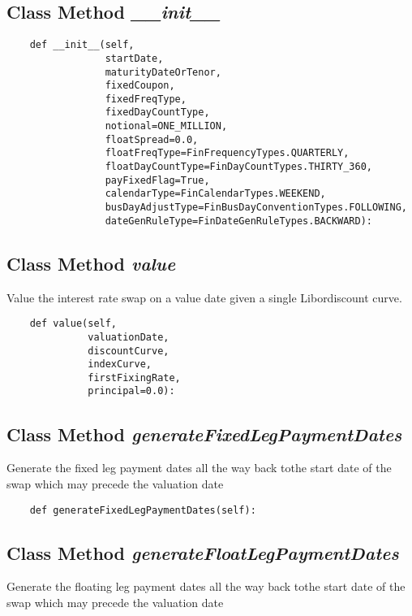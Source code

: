 \documentclass[twoside,11pt]{book}
\begin{document}
\subsection{Class Method {\it \_\_init\_\_}}


\begin{lstlisting}
    def __init__(self,
                 startDate,
                 maturityDateOrTenor,
                 fixedCoupon,
                 fixedFreqType,
                 fixedDayCountType,
                 notional=ONE_MILLION,
                 floatSpread=0.0,
                 floatFreqType=FinFrequencyTypes.QUARTERLY,
                 floatDayCountType=FinDayCountTypes.THIRTY_360,
                 payFixedFlag=True,
                 calendarType=FinCalendarTypes.WEEKEND,
                 busDayAdjustType=FinBusDayConventionTypes.FOLLOWING,
                 dateGenRuleType=FinDateGenRuleTypes.BACKWARD):
\end{lstlisting}

\subsection{Class Method {\it value}}
Value the interest rate swap on a value date given a single Libordiscount curve. 

\begin{lstlisting}
    def value(self,
              valuationDate,
              discountCurve,
              indexCurve,
              firstFixingRate,
              principal=0.0):
\end{lstlisting}

\subsection{Class Method {\it generateFixedLegPaymentDates}}
Generate the fixed leg payment dates all the way back tothe start date of the swap which may precede the valuation date

\begin{lstlisting}
    def generateFixedLegPaymentDates(self):
\end{lstlisting}

\subsection{Class Method {\it generateFloatLegPaymentDates}}
Generate the floating leg payment dates all the way back tothe start date of the swap which may precede the valuation date
\end{document}
